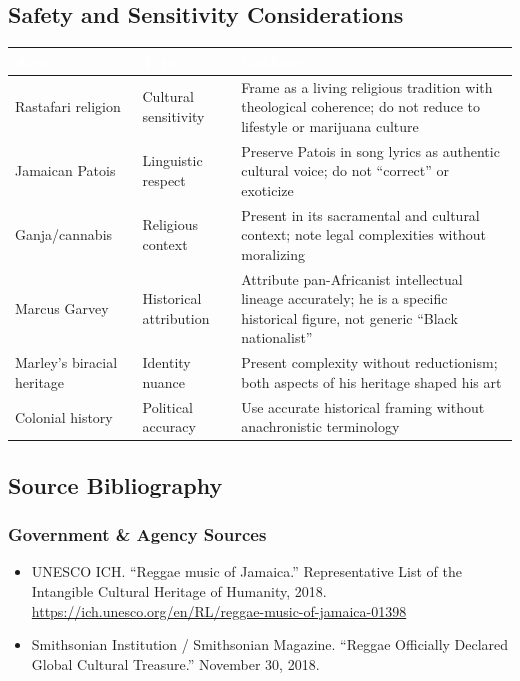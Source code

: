 \documentclass[11pt,letterpaper]{article}
\newcommand{\tableheader}[1]{\textbf{\sffamily\textcolor{white}{#1}}}
\begin{document}
\subsection{Safety and Sensitivity Considerations}

\begin{center}
\begin{tabularx}{\textwidth}{L{4cm}L{3cm}X}
\toprule
{}
\tableheader{Area} & \tableheader{Type} & \tableheader{Guidance} \\
\midrule
Rastafari religion & Cultural sensitivity & Frame as a living religious tradition with theological coherence; do not reduce to lifestyle or marijuana culture \\
Jamaican Patois & Linguistic respect & Preserve Patois in song lyrics as authentic cultural voice; do not ``correct'' or exoticize \\
Ganja/cannabis & Religious context & Present in its sacramental and cultural context; note legal complexities without moralizing \\
Marcus Garvey & Historical attribution & Attribute pan-Africanist intellectual lineage accurately; he is a specific historical figure, not generic ``Black nationalist'' \\
Marley's biracial heritage & Identity nuance & Present complexity without reductionism; both aspects of his heritage shaped his art \\
Colonial history & Political accuracy & Use accurate historical framing without anachronistic terminology \\
\bottomrule
\end{tabularx}
\end{center}

\subsection{Source Bibliography}

\subsubsection{Government \& Agency Sources}
\begin{itemize}[noitemsep]
  \item UNESCO ICH. ``Reggae music of Jamaica.'' Representative List of the Intangible Cultural Heritage of Humanity, 2018. \url{https://ich.unesco.org/en/RL/reggae-music-of-jamaica-01398}
  \item Smithsonian Institution / Smithsonian Magazine. ``Reggae Officially Declared Global Cultural Treasure.'' November 30, 2018.
\end{itemize}
\end{document}
